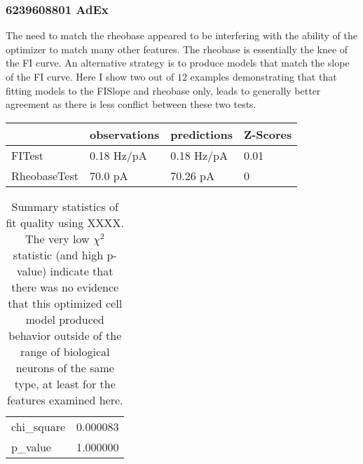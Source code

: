 \subsubsection{6239608801 AdEx}
The need to match the rheobase appeared to be interfering with the ability of the optimizer to match many other features.
The rheobase is essentially the knee of the FI curve.
An alternative strategy is to produce models that match the slope of the FI curve.
Here I show two out of $12$ examples demonstrating that that fitting models to the FISlope and rheobase only, leads to generally better agreement as there is less conflict between these two tests.

\begin{table}
\begin{center}
\begin{tabular}{|l|l|l|l|}
\toprule
{} & observations &   predictions & Z-Scores \\
\midrule
FITest       &   0.18 Hz/pA &  0.18 Hz/pA &     0.01 \\
RheobaseTest &      70.0 pA &      70.26 pA &        0 \\
\bottomrule
\end{tabular}
\end{center}
\end{table}

\begin{table}
\begin{center}
\begin{tabular}{|l|r|}
\toprule
chi\_square &  0.000083 \\
p\_value    &  1.000000 \\
\bottomrule
\end{tabular}
\end{center}
\caption[Quality of Fit to Experimental Data]{Summary statistics of fit quality using XXXX.
The very low $\chi^2$ statistic (and high p-value) indicate that there was no evidence that this optimized cell model produced behavior outside of the range of biological neurons of the same type, at least for the features examined here.}
\label{tab:chi2-p-1}
\end{table}


